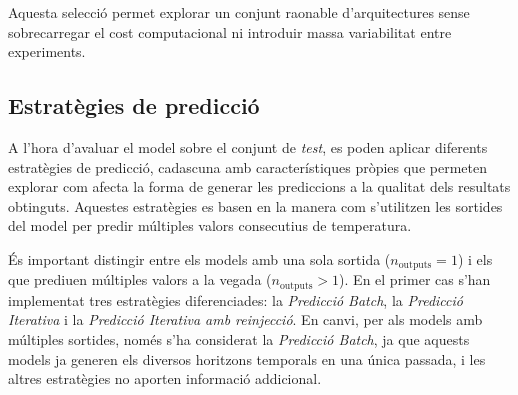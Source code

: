 \documentclass[../main.tex]{subfiles}
\begin{document}
Aquesta selecció permet explorar un conjunt raonable d’arquitectures sense sobrecarregar el cost computacional ni introduir massa variabilitat entre experiments.



\subsection{Estratègies de predicció}

A l’hora d’avaluar el model sobre el conjunt de \textit{test}, es poden aplicar diferents estratègies de predicció, cadascuna amb característiques pròpies que permeten explorar com afecta la forma de generar les prediccions a la qualitat dels resultats obtinguts. Aquestes estratègies es basen en la manera com s’utilitzen les sortides del model per predir múltiples valors consecutius de temperatura.

És important distingir entre els models amb una sola sortida ($n_{\text{outputs}} = 1$) i els que prediuen múltiples valors a la vegada ($n_{\text{outputs}} > 1$). En el primer cas s’han implementat tres estratègies diferenciades: la \textit{Predicció Batch}, la \textit{Predicció Iterativa} i la \textit{Predicció Iterativa amb reinjecció}. En canvi, per als models amb múltiples sortides, només s’ha considerat la \textit{Predicció Batch}, ja que aquests models ja generen els diversos horitzons temporals en una única passada, i les altres estratègies no aporten informació addicional.
\end{document}
